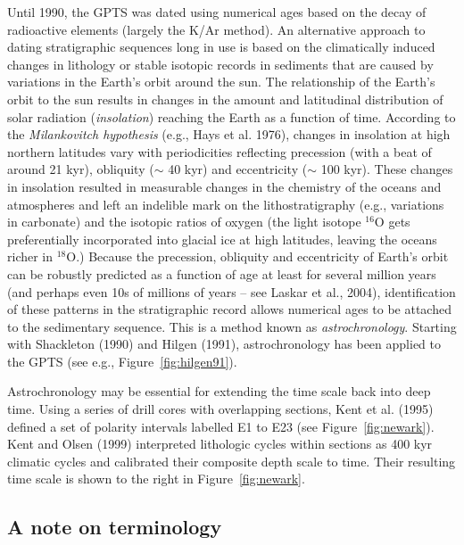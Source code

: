 Until 1990, the GPTS was dated using numerical ages based on the decay of radioactive elements (largely the K/Ar method).  An alternative approach to dating stratigraphic sequences long in  use  is based on the climatically induced changes in lithology or stable isotopic records in sediments that are caused by variations in the Earth's orbit around the sun.    The relationship of the Earth's orbit to the sun results in changes in the amount and latitudinal distribution of solar radiation ({\it insolation}) reaching the Earth as a function of time.  According to the
 {\it Milankovitch hypothesis} (e.g., 
 Hays et al. 1976), \nocite{hays76} changes in insolation at high northern latitudes vary with periodicities reflecting precession (with a beat of around 21 kyr), obliquity ($\sim$ 40 kyr) and eccentricity ($\sim$ 100 kyr).  These changes in insolation  resulted in measurable changes in the chemistry of the oceans and atmospheres and left an indelible mark on the lithostratigraphy (e.g., variations in carbonate) and the isotopic ratios of oxygen (the light isotope $^{16}$O gets preferentially incorporated into glacial ice at high latitudes, leaving the oceans richer in $^{18}$O.)  Because the precession, obliquity and eccentricity of Earth's orbit can be robustly predicted as a function of age at least for several million years (and perhaps even 10s of millions of years -- see Laskar et al., 2004), \nocite{laskar04}  identification of these patterns in the stratigraphic record allows numerical ages to be attached to the sedimentary sequence.  This is  a method known as 
{\it astrochronology}.  
Starting with Shackleton (1990) and Hilgen  (1991), astrochronology has been applied to the GPTS (see e.g., Figure~\ref{fig:hilgen91}).    

Astrochronology may be essential for extending the time scale back into deep time.  Using a series of drill cores with overlapping sections, 
 Kent et al. (1995) defined a set of polarity intervals labelled E1 to E23 (see Figure~\ref{fig:newark}).  Kent and 
 Olsen (1999) \nocite{kent95} \nocite{kent99b} interpreted  lithologic cycles within sections as 400 kyr climatic cycles and calibrated their composite depth scale to time.    Their resulting time scale is shown to the right in Figure~\ref{fig:newark}.    




\subsection{ A note on terminology}


